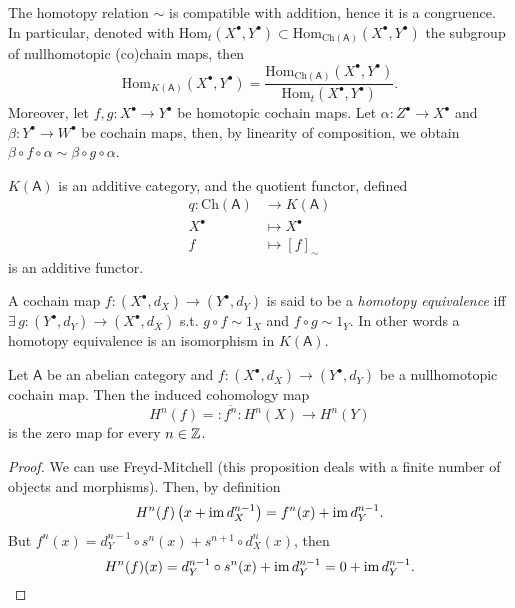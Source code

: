 \begin{rem}[]
	The homotopy relation $\sim$ is compatible with addition, hence it is a congruence.
	In particular, denoted with
	$\mathrm{Hom}_{t}\left( X^\bullet, Y^\bullet \right) \subset
	\mathrm{Hom}_{\mathrm{Ch}(\mathsf{A})}\left( X^\bullet, Y^\bullet \right)$ the subgroup of
	nullhomotopic (co)chain maps, then
	\begin{equation}
		\mathrm{Hom}_{K(\mathsf{A})}\left( X^\bullet, Y^\bullet \right) =
		\frac{\mathrm{Hom}_{\mathrm{Ch}(\mathsf{A})}\left( X^\bullet, Y^\bullet \right)}{
		\mathrm{Hom}_{t}\left( X^\bullet, Y^\bullet \right)}
	.\end{equation} 
	Moreover, let $f,g: X^\bullet \to Y^\bullet$ be homotopic cochain maps.
	Let $\alpha: Z^\bullet \to X^\bullet$ and $\beta: Y^\bullet \to W^\bullet$ be cochain maps,
	then, by linearity of composition, we obtain
	$\beta \circ f \circ \alpha \sim \beta \circ g \circ \alpha$.
\end{rem}

\begin{prop}
	$K(\mathsf{A})$ is an additive category, and the quotient functor,
	defined
	\begin{align}
		q: \mathrm{Ch}(\mathsf{A}) &\to K(\mathsf{A}) \\
		X^\bullet &\mapsto X^\bullet\\
		f &\mapsto [f]_{\sim}
	\end{align} 
	is an additive functor.
\end{prop} 

\begin{defn}
	A cochain map $f: \left( X^{\bullet}, d_{X} \right) \to \left( Y^{\bullet}, d_{Y} \right)$
	is said to be a {\em homotopy equivalence} iff
	$\exists\, g: \left( Y^{\bullet}, d_{Y} \right) \to \left( X^{\bullet}, d_{X} \right)$
	s.t.
	$g \circ f \sim 1_X$ and $f \circ g \sim 1_Y$.
	In other words a homotopy equivalence is an isomorphism in $K(\mathsf{A})$.
\end{defn}

\begin{prop}
	Let $\mathsf{A}$ be an abelian category and
	$f: \left( X^{\bullet}, d_{X} \right) \to \left( Y^{\bullet}, d_{Y} \right)$ be a
	nullhomotopic cochain map.
	Then the induced cohomology map
	\begin{equation}
		H^n(f) =: \overline{f^n}: H^n(X) \to H^n(Y)
	\end{equation} 
	is the zero map for every $n \in \mathbb{Z}$.
\end{prop} 
\begin{proof}
	We can use Freyd-Mitchell
	(this proposition deals with a finite number of objects and morphisms).
	Then, by definition
	\begin{equation}
		H^n(f) \left( x + \operatorname{im} d_X^{n-1} \right) = f^n(x) + \operatorname{im} d_Y^{n-1}
	.\end{equation} 
	But $f^n(x) = d^{n-1}_Y \circ s^n(x) + s^{n+1} \circ d_X^{n}(x)$,
	then
	\begin{equation*}
		H^n(f)(x) = d^{n-1}_Y \circ s^n (x) + \operatorname{im} d_Y^{n-1} = 0 + \operatorname{im} d_Y^{n-1}.\qedhere
	\end{equation*} 
\end{proof}

